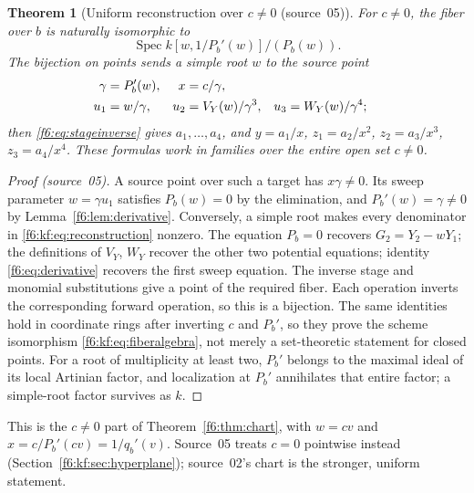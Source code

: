 \documentclass[11pt,a4paper]{article}
\newtheorem{theorem}{Theorem}[section]
\theoremstyle{definition}
\newcommand{\Spec}{\operatorname{Spec}}
\newcommand{\src}[1]{\textup{(source~#1)}}
\begin{document}
\begin{theorem}[Uniform reconstruction over $c\ne0$ \src{05}]
\label{f6:kf:thm:reconstruction}
For $c\ne0$, the fiber over $b$ is naturally isomorphic to
\begin{equation}\label{f6:kf:eq:fiberalgebra}
 \Spec k[w,1/P_b'(w)]/(P_b(w)).
\end{equation}
The bijection on points sends a simple root $w$ to the source point
\begin{align}
\gamma&=P_b'(w),& x&=c/\gamma,\notag\\
u_1&=w/\gamma,& u_2&=V_Y(w)/\gamma^3,& u_3&=W_Y(w)/\gamma^4;
\label{f6:kf:eq:reconstruction}
\end{align}
then \eqref{f6:eq:stageinverse} gives $a_1,\dots,a_4$, and
$y=a_1/x$, $z_1=a_2/x^2$, $z_2=a_3/x^3$, $z_3=a_4/x^4$. These formulas
work in families over the entire open set $c\ne0$.
\end{theorem}
\begin{proof}[Proof \src{05}]
A source point over such a target has $x\gamma\ne0$. Its sweep parameter
$w=\gamma u_1$ satisfies $P_b(w)=0$ by the elimination, and
$P_b'(w)=\gamma\ne0$ by Lemma~\ref{f6:lem:derivative}. Conversely, a simple
root makes every denominator in \eqref{f6:kf:eq:reconstruction} nonzero. The
equation $P_b=0$ recovers $G_2=Y_2-wY_1$; the definitions of $V_Y$, $W_Y$
recover the other two potential equations; identity
\eqref{f6:eq:derivative} recovers the first sweep equation. The inverse
stage and monomial substitutions give a point of the required fiber. Each
operation inverts the corresponding forward operation, so this is a
bijection. The same identities hold in coordinate rings after inverting $c$
and $P_b'$, so they prove the scheme isomorphism
\eqref{f6:kf:eq:fiberalgebra}, not merely a set-theoretic statement for
closed points. For a root of multiplicity at least two, $P_b'$ belongs to
the maximal ideal of its local Artinian factor, and localization at $P_b'$
annihilates that entire factor; a simple-root factor survives as $k$.
\end{proof}

This is the $c\ne0$ part of Theorem~\ref{f6:thm:chart}, with $w=cv$ and
$x=c/P_b'(cv)=1/q_b'(v)$. Source~05 treats $c=0$ pointwise instead
(Section~\ref{f6:kf:sec:hyperplane}); source~02's chart is the stronger,
uniform statement.

\end{document}
